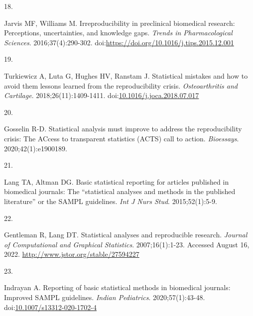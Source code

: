 \documentclass[
]{article}
\newlength{\cslhangindent}
\newlength{\csllabelwidth}
\newlength{\cslentryspacingunit} %
\newenvironment{CSLReferences}[2] %
 {%
  \setlength{\parindent}{0pt}
  \ifodd #1
  \let\oldpar\par
  \def\par{\hangindent=\cslhangindent\oldpar}
  \fi
  \setlength{\parskip}{#2\cslentryspacingunit}
 }%
 {}
\newcommand{\CSLLeftMargin}[1]{\parbox[t]{\csllabelwidth}{#1}}
\newcommand{\CSLRightInline}[1]{\parbox[t]{\linewidth - \csllabelwidth}{#1}\break}
\begin{document}
\begin{CSLReferences}{0}{0}
\leavevmode{}%
\CSLLeftMargin{18. }%
\CSLRightInline{Jarvis MF, Williams M. Irreproducibility in preclinical
biomedical research: Perceptions, uncertainties, and knowledge gaps.
\emph{Trends in Pharmacological Sciences}. 2016;37(4):290-302.
doi:\url{https://doi.org/10.1016/j.tips.2015.12.001}}

\leavevmode{}%
\CSLLeftMargin{19. }%
\CSLRightInline{Turkiewicz A, Luta G, Hughes HV, Ranstam J. Statistical
mistakes and how to avoid them {\textendash} lessons learned from the
reproducibility crisis. \emph{Osteoarthritis and Cartilage}.
2018;26(11):1409-1411.
doi:\href{https://doi.org/10.1016/j.joca.2018.07.017}{10.1016/j.joca.2018.07.017}}

\leavevmode{}%
\CSLLeftMargin{20. }%
\CSLRightInline{Gosselin R-D. Statistical analysis must improve to
address the reproducibility crisis: The {ACcess} to transparent
statistics ({ACTS}) call to action. \emph{Bioessays}.
2020;42(1):e1900189.}

\leavevmode{}%
\CSLLeftMargin{21. }%
\CSLRightInline{Lang TA, Altman DG. Basic statistical reporting for
articles published in biomedical journals: The {``statistical analyses
and methods in the published literature''} or the {SAMPL} guidelines.
\emph{Int J Nurs Stud}. 2015;52(1):5-9.}

\leavevmode{}%
\CSLLeftMargin{22. }%
\CSLRightInline{Gentleman R, Lang DT. Statistical analyses and
reproducible research. \emph{Journal of Computational and Graphical
Statistics}. 2007;16(1):1-23. Accessed August 16, 2022.
\url{http://www.jstor.org/stable/27594227}}

\leavevmode{}%
\CSLLeftMargin{23. }%
\CSLRightInline{Indrayan A. Reporting of basic statistical methods in
biomedical journals: Improved {SAMPL} guidelines. \emph{Indian
Pediatrics}. 2020;57(1):43-48.
doi:\href{https://doi.org/10.1007/s13312-020-1702-4}{10.1007/s13312-020-1702-4}}

\end{CSLReferences}
\end{document}
